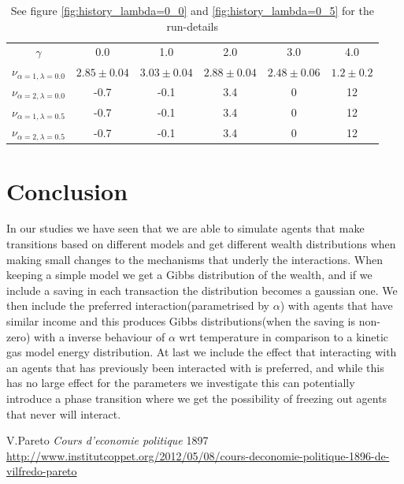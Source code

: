 \documentclass[a4paper,11pt]{article}
\begin{document}
{\begin{table}[h]
\caption{See figure \ref{fig:history_lambda=0_0} and \ref{fig:history_lambda=0_5} for the run-details}
\begin{center}
\begin{tabular}{c|c|c|c|c|c}
$\gamma$ & 0.0 & 1.0 & 2.0 & 3.0 & 4.0  \\
$\nu_{\alpha=1, \lambda=0.0}$ & $2.85\pm 0.04$ & $3.03\pm 0.04$ & $2.88\pm 0.04$ & $2.48\pm 0.06$ & $1.2\pm0.2$\\
$\nu_{\alpha=2, \lambda=0.0}$ & -0.7 & -0.1 & 3.4 & 0 & 12\\
$\nu_{\alpha=1, \lambda=0.5}$ & -0.7 & -0.1 & 3.4 & 0 &12  \\
$\nu_{\alpha=2, \lambda=0.5}$ & -0.7 & -0.1 & 3.4 & 0 & 12
\end{tabular}
\end{center}
\label{tab:hist}
\end{table}%




\section*{Conclusion}
In our studies we have seen that we are able to simulate agents that make transitions based on different models and get different wealth distributions when making small changes to the mechanisms that underly the interactions. When keeping a simple model we get a Gibbs distribution of the wealth, and if we include a saving in each transaction the distribution becomes a gaussian one. We then include the preferred interaction(parametrised by $\alpha$) with agents that have similar income and this produces Gibbs distributions(when the saving is non-zero) with a inverse behaviour of $\alpha$ wrt temperature in comparison to a kinetic gas model energy distribution. At last we include the effect that interacting with an agents that has previously been interacted with is preferred, and while this has no large effect for the parameters we investigate this can potentially introduce a phase transition where we get the possibility of freezing out agents that never will interact. 







\begin{thebibliography}{3}
			
	V.Pareto
	\emph{Cours d'economie politique}
	1897
	\url{http://www.institutcoppet.org/2012/05/08/cours-deconomie-politique-1896-de-vilfredo-pareto}
	

\end{thebibliography}}
\end{document}
